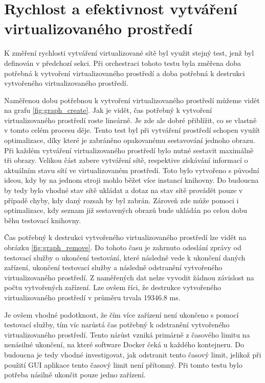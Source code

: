 \section{Rychlost a efektivnost vytváření virtualizovaného prostředí}

K změření rychlosti vytváření virtualizované sítě byl využit stejný test, jenž byl definován v předchozí sekci. Při orchestraci tohoto testu byla změřena doba potřebná k vytvoření virtualizovaného prostředí a doba potřebná k destrukci vytvořeného virtualizovaného prostředí. 

Naměřenou dobu potřebnou k vytvoření virtualizovaného prostředí můžeme vidět na grafu \ref{fig:graph_create}. Jak je vidět, čas potřebný k vytvoření virtualizovaného prostředí roste lineárně. Je zde ale dobré přiblížit, co se vlastně v tomto celém procesu děje. Tento test byl při vytváření prostředí schopen využít optimalizace, díky které je zabráněno opakovanému sestavování jednoho obrazu. Při každém vytváření virtualizovaného prostředí bylo nutné sestavit maximálně tři obrazy. Velikou část zabere vytváření sítě, respektive získávání informací o aktuálním stavu sítí ve virtualizovaném prostředí. Toto bylo vytvořeno s původní ideou, kdy by na jednom stroji mohlo běžet více instancí knihovny. Do budoucna by tedy bylo vhodné stav sítě ukládat a dotaz na stav sítě provádět pouze v případě chyby, kdy daný rozsah by byl zabrán. Zároveň zde může pomoci i optimalizace, kdy seznam již sestavených obrazů bude ukládán po celou dobu běhu testovací knihovny.

Čas potřebný k destrukci vytvořeného virtualizovaného prostředí lze vidět na obrázku \ref{fig:graph_remove}. Do tohoto času je zahrnuto odeslání zprávy od testovací služby o ukončení testování, které následně vede k ukončení daných zařízení, ukončení testovací služby a následně odstranění vytvořeného virtualizovaného prostředí. Z naměřených dat nelze vyvodit žádnou závislost na počtu vytvořených zařízení. Lze ovšem říci, že destrukce vytvořeného virtualizovaného prostředí v průměru trvala 19346.8 ms. 

Je ovšem vhodné podotknout, že čím více zařízení není ukončeno s pomocí testovací služby, tím víc narůstá čas potřebný k odstranění vytvořeného virtualizovaného prostředí. Tento nárůst vzniká primárně z časového limitu na nenásilné ukončení, na které software Docker čeká u každého kontejneru. Do budoucna je tedy vhodné investigovat, jak odstranit tento časový limit, jelikož při použití GUI aplikace tento časový limit není přítomný. Při tomto testu bylo potřeba násilně ukončit pouze jedno zařízení.

